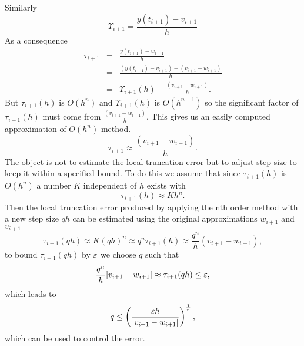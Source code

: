 Similarly
\[ \Upsilon_{i+1} =\frac{y(t_{i+1})-v_{i+1}}{h} \]
As a consequence
\begin{eqnarray*}
\tau_{i+1} &=& \frac{y(t_{i+1})-w_{i+1}}{h} \\
 &=& \frac{(y(t_{i+1})-v_{i+1})+(v_{i+1}-w_{i+1})}{h} \\
 &=& \Upsilon_{i+1}(h)+\frac{(v_{i+1}-w_{i+1})}{h}. 
\end{eqnarray*}
But $\tau_{i+1}(h)$ is $O(h^n)$ and $\Upsilon_{i+1}(h)$ is $O(h^{n+1})$ so the 
significant factor of $\tau_{i+1}(h)$ must come from $\frac{(v_{i+1}-w_{i+1})}{h}$.  This gives us an easily computed approximation of $O(h^n)$ method.
\[\tau_{i+1} \approx \frac{(v_{i+1}-w_{i+1})}{h}.  \]
The object is not to estimate the local truncation error but to adjust step size to 
keep it within a specified bound.  To do this we assume that since $\tau_{i+1}(h)$ is $O(h^n)$ a number $K$ independent of $h$ exists with \[\tau_{i+1}(h) \approx Kh^n. \]
Then the local truncation error produced by applying the nth order method with a
new step size $qh$ can be estimated using the original approximations $w_{i+1}$ 
and $v_{i+1}$
\[\tau_{i+1}(qh) \approx K(qh)^n \approx q^n\tau_{i+1}(h) \approx \frac{q^n}{h}(v_{i+1}-w_{i+1}), \]
to bound $\tau_{i+1}(qh)$ by $\varepsilon$ we choose $q$ such that
\[\frac{q^n}{h}|v_{i+1}-w_{i+1}|\approx \tau_{i+1}(qh) \leq \varepsilon, \]
which leads to
\[ q \leq \left( \frac{\varepsilon h }{|v_{i+1}-w_{i+1}|}\right)^{\frac{1}{n}}, \]
which can be used to control the error.


\newpage
